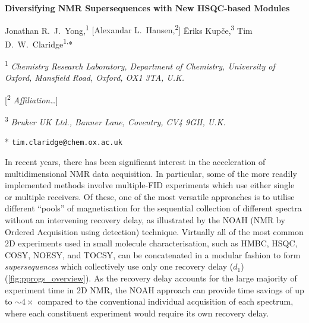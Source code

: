 \documentclass[11pt]{article}
\newcommand*{\hsqctitle}{Diversifying NMR Supersequences with New HSQC-based Modules}
\newcommand*{\hl}[1]{\textcolor{WildStrawberry}{#1}}
\newcommand*{\proton}{\ce{^{1}H}}
\begin{document}
\begin{center}
    \Large \textbf{\hsqctitle{}}

    \vspace{0.2cm}

    \large Jonathan R.\ J.\ Yong,\textsuperscript{1} \hl{[Alexandar L.\ Hansen,\textsuperscript{2}]} {\=E}riks Kup{\v{c}}e,\textsuperscript{3} Tim D.\ W.\ Claridge\textsuperscript{1,}*

    \vspace{0.2cm}

    \normalsize

    \textsuperscript{1} \textit{Chemistry Research Laboratory, Department of Chemistry, University of Oxford, Mansfield Road, Oxford, OX1 3TA, U.K.}

    \hl{[\textsuperscript{2} \textit{Affiliation\ldots}]}

    \textsuperscript{3} \textit{Bruker UK Ltd., Banner Lane, Coventry, CV4 9GH, U.K.}

    * \texttt{tim.claridge@chem.ox.ac.uk}
\end{center}
\vspace{0.5cm}

\begin{abstract}
    The sensitivity-enhanced HSQC, as well as HSQC-TOCSY, experiments can be incorporated into NOAH (NMR by Ordered Acquisition using \proton{} detection) supersequences.
    Importantly, these heteronuclear modules preserve the magnetisation required for subsequent acquisition of other homonuclear modules in the supersequence.
    With these new modules, we reach a total of over 600 practically applicable NOAH supersequences which yield high-quality 2D spectra with greatly reduced experiment durations.
\end{abstract}


In recent years, there has been significant interest in the acceleration of multidimensional NMR data acquisition.\autocite{ultrafast, timeshared, multireceive}
In particular, some of the more readily implemented methods involve multiple-FID experiments which use either single or multiple receivers.
Of these, one of the most versatile approaches is to utilise different ``pools'' of magnetisation for the sequential collection of different spectra without an intervening recovery delay, as illustrated by the NOAH (NMR by Ordered Acquisition using \proton{} detection) technique.\autocite{noah}
Virtually all of the most common 2D experiments used in small molecule characterisation, such as HMBC, HSQC, COSY, NOESY, and TOCSY, can be concatenated in a modular fashion to form \textit{supersequences} which collectively use only one recovery delay ($d_1$) (\cref{fig:pprogs_overview}).
As the recovery delay accounts for the large majority of experiment time in 2D NMR, the NOAH approach can provide time savings of up to $\sim 4\times$ compared to the conventional individual acquisition of each spectrum, where each constituent experiment would require its own recovery delay.
\end{document}
